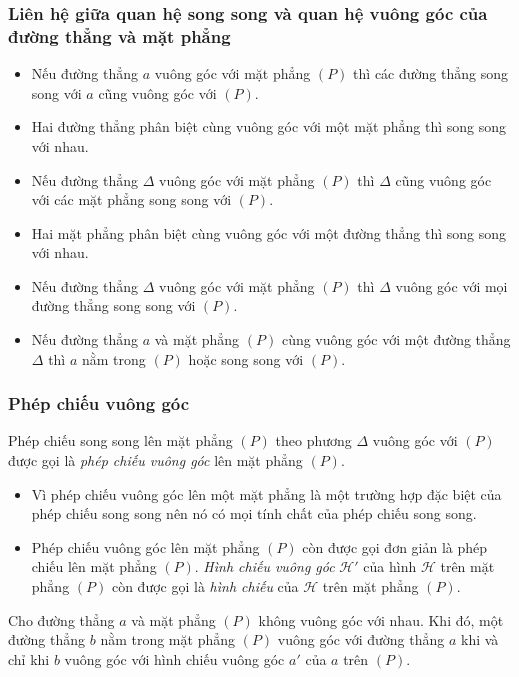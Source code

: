 \begin{tomtat}
\subsubsection{Liên hệ giữa quan hệ song song và quan hệ vuông góc của đường thẳng và mặt phẳng}
\begin{boxdn}
	\begin{itemize}
	\item Nếu đường thẳng $a$ vuông góc với mặt phẳng $(P)$ thì các đường thẳng song song với $a$ cũng vuông góc với $(P)$.
	\item Hai đường thẳng phân biệt cùng vuông góc với một mặt phẳng thì song song với nhau.
	\end{itemize}
\end{boxdn}
\begin{boxdl}
	\begin{itemize}
	\item Nếu đường thẳng $\Delta$ vuông góc với mặt phẳng $(P)$ thì $\Delta$ cũng vuông góc với các mặt phẳng song song với $(P)$.
	\item Hai mặt phẳng phân biệt cùng vuông góc với một đường thẳng thì song song với nhau.
	\end{itemize}
\end{boxdl}
\begin{boxdn}
	\begin{itemize}
	\item Nếu đường thẳng $\Delta$ vuông góc với mặt phẳng $(P)$ thì $\Delta$ vuông góc với mọi đường thẳng song song với $(P)$.
	\item Nếu đường thẳng $a$ và mặt phẳng $(P)$ cùng vuông góc với một đường thẳng $\Delta$ thì $a$ nằm trong $(P)$ hoặc song song với $(P)$.
	\end{itemize}
\end{boxdn}
\subsubsection{Phép chiếu vuông góc}
\begin{boxdn}
	Phép chiếu song song lên mặt phẳng $(P)$ theo phương $\Delta$ vuông góc với $(P)$ được gọi là \emph{phép chiếu vuông góc} lên mặt phẳng $(P)$.
\end{boxdn}
\begin{note}
	\begin{itemize}
		\item Vì phép chiếu vuông góc lên một mặt phẳng là một trường hợp đặc biệt của phép chiếu song song nên nó có mọi tính chất của phép chiếu song song.
		\item Phép chiếu vuông góc lên mặt phẳng $(P)$ còn được gọi đơn giản là phép chiếu lên mặt phẳng $(P)$. \emph{Hình chiếu vuông góc} $\mathscr{H}'$ của hình $\mathscr{H}$ trên mặt phẳng $(P)$ còn được gọi là \emph{hình chiếu} của $\mathscr{H}$ trên mặt phẳng $(P)$.
	\end{itemize}
\end{note}
\begin{boxdl}
	Cho đường thẳng $a$ và mặt phẳng $(P)$ không vuông góc với nhau. Khi đó, một đường thẳng $b$ nằm trong mặt phẳng $(P)$ vuông góc với đường thẳng $a$ khi và chỉ khi $b$ vuông góc với hình chiếu vuông góc $a'$ của $a$ trên $(P)$.
\end{boxdl}

\end{tomtat}
